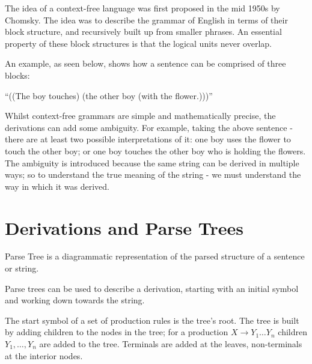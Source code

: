 
The idea of a context-free language was first proposed in the mid 1950s by Chomsky. The idea was to describe the grammar of English in terms of their block structure, and recursively built up from smaller phrases. An essential property of these block structures is that the logical units never overlap.

An example, as seen below, shows how a sentence can be comprised of three blocks:
\begin{center}
    ``((The boy touches) (the other boy (with the flower.)))''
\end{center}

Whilst context-free grammars are simple and mathematically precise, the derivations can add some ambiguity. For example, taking the above sentence - there are at least two possible interpretations of it: one boy uses the flower to touch the other boy; or one boy touches the other boy who is holding the flowers. The ambiguity is introduced because the same string can be derived in multiple ways; so to understand the true meaning of the string - we must understand the way in which it was derived.

\section{Derivations and Parse Trees}
\begin{define}
    \item[Parse Tree] is a diagrammatic representation of the parsed structure of a sentence or string.
\end{define}

Parse trees can be used to describe a derivation, starting with an initial symbol and working down towards the string.

The start symbol of a set of production rules is the tree's root. The tree is built by adding children to the nodes in the tree; for a production $X \rightarrow Y_1 \ldots Y_n$ children $Y_1, \ldots, Y_n$ are added to the tree. Terminals are added at the leaves, non-terminals at the interior nodes.

